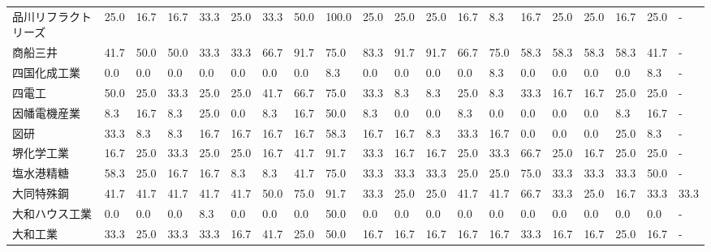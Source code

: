 \begin{tabular}{llllllllllllllllllll}
品川リフラクトリーズ      &   25.0 &   16.7 &      16.7 &      33.3 &       25.0 &   33.3 &   50.0 &  100.0 &    25.0 &    25.0 &   25.0 &  16.7 &    8.3 &    16.7 &    25.0 &  25.0 &  16.7 &  25.0 &     - \\
商船三井            &   41.7 &   50.0 &      50.0 &      33.3 &       33.3 &   66.7 &   91.7 &   75.0 &    83.3 &    91.7 &   91.7 &  66.7 &   75.0 &    58.3 &    58.3 &  58.3 &  58.3 &  41.7 &     - \\
四国化成工業          &    0.0 &    0.0 &       0.0 &       0.0 &        0.0 &    0.0 &    0.0 &    8.3 &     0.0 &     0.0 &    0.0 &   0.0 &    8.3 &     0.0 &     0.0 &   0.0 &   0.0 &   8.3 &     - \\
四電工             &   50.0 &   25.0 &      33.3 &      25.0 &       25.0 &   41.7 &   66.7 &   75.0 &    33.3 &     8.3 &    8.3 &  25.0 &    8.3 &    33.3 &    16.7 &  16.7 &  25.0 &  25.0 &     - \\
因幡電機産業          &    8.3 &   16.7 &       8.3 &      25.0 &        0.0 &    8.3 &   16.7 &   50.0 &     8.3 &     0.0 &    0.0 &   8.3 &    0.0 &     0.0 &     0.0 &   0.0 &   8.3 &  16.7 &     - \\
図研              &   33.3 &    8.3 &       8.3 &      16.7 &       16.7 &   16.7 &   16.7 &   58.3 &    16.7 &    16.7 &    8.3 &  33.3 &   16.7 &     0.0 &     0.0 &   0.0 &  25.0 &   8.3 &     - \\
堺化学工業           &   16.7 &   25.0 &      33.3 &      25.0 &       25.0 &   16.7 &   41.7 &   91.7 &    33.3 &    16.7 &   16.7 &  25.0 &   33.3 &    66.7 &    25.0 &  16.7 &  25.0 &  25.0 &     - \\
塩水港精糖           &   58.3 &   25.0 &      16.7 &      16.7 &        8.3 &    8.3 &   41.7 &   75.0 &    33.3 &    33.3 &   33.3 &  25.0 &   25.0 &    75.0 &    33.3 &  33.3 &  33.3 &  50.0 &     - \\
大同特殊鋼           &   41.7 &   41.7 &      41.7 &      41.7 &       41.7 &   50.0 &   75.0 &   91.7 &    33.3 &    25.0 &   25.0 &  41.7 &   41.7 &    66.7 &    33.3 &  25.0 &  16.7 &  33.3 &  33.3 \\
大和ハウス工業         &    0.0 &    0.0 &       0.0 &       8.3 &        0.0 &    0.0 &    0.0 &   50.0 &     0.0 &     0.0 &    0.0 &   0.0 &    0.0 &     0.0 &     0.0 &   0.0 &   0.0 &   0.0 &     - \\
大和工業            &   33.3 &   25.0 &      33.3 &      33.3 &       16.7 &   41.7 &   25.0 &   50.0 &    16.7 &    16.7 &   16.7 &  16.7 &   16.7 &    33.3 &    16.7 &  16.7 &  25.0 &  16.7 &     - \\

\end{tabular}
